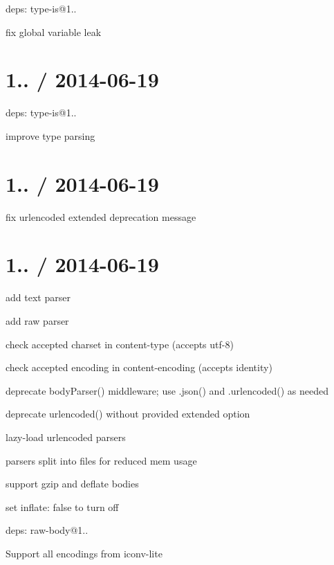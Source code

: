 \begin{DoxyItemize}
\item deps\+: type-\/is@1..
\begin{DoxyItemize}
\item fix global variable leak
\end{DoxyItemize}
\end{DoxyItemize}

\section*{1.. / 2014-\/06-\/19 }


\begin{DoxyItemize}
\item deps\+: type-\/is@1..
\begin{DoxyItemize}
\item improve type parsing
\end{DoxyItemize}
\end{DoxyItemize}

\section*{1.. / 2014-\/06-\/19 }


\begin{DoxyItemize}
\item fix urlencoded extended deprecation message
\end{DoxyItemize}

\section*{1.. / 2014-\/06-\/19 }


\begin{DoxyItemize}
\item add {\ttfamily text} parser
\item add {\ttfamily raw} parser
\item check accepted charset in content-\/type (accepts utf-\/8)
\item check accepted encoding in content-\/encoding (accepts identity)
\item deprecate {\ttfamily body\+Parser()} middleware; use {\ttfamily .json()} and {\ttfamily .urlencoded()} as needed
\item deprecate {\ttfamily urlencoded()} without provided {\ttfamily extended} option
\item lazy-\/load urlencoded parsers
\item parsers split into files for reduced mem usage
\item support gzip and deflate bodies
\begin{DoxyItemize}
\item set {\ttfamily inflate\+: false} to turn off
\end{DoxyItemize}
\item deps\+: raw-\/body@1..
\begin{DoxyItemize}
\item Support all encodings from {\ttfamily iconv-\/lite}
\end{DoxyItemize}
\end{DoxyItemize}

